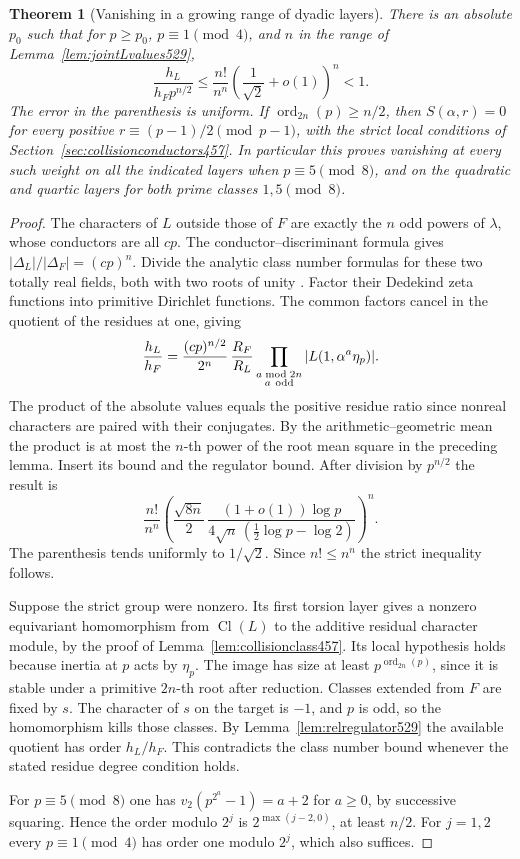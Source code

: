 \documentclass[a4paper,11pt]{article}
\newtheorem{theorem}[proposition]{Theorem}
\theoremstyle{definition}
\theoremstyle{remark}
\numberwithin{equation}{section}
\begin{document}
\begin{theorem}[Vanishing in a growing range of dyadic layers]
\leavevmode\label{thm:halfdyadic529}
There is an absolute \(p_0\) such that for \(p\ge p_0\),
\(p\equiv1\pmod4\), and \(n\) in the range of
Lemma~\ref{lem:jointLvalues529},
\[
 \frac{h_L}{h_F p^{n/2}}
        \le \frac{n!}{n^n}\left(\frac1{\sqrt2}+o(1)\right)^n
        <1 .
\]
The error in the parenthesis is uniform. If
\(\operatorname{ord}_{2n}(p)\ge n/2\), then
\(S(\alpha,r)=0\) for every positive
\(r\equiv(p-1)/2\pmod{p-1}\), with the strict local conditions
of Section~\ref{sec:collisionconductors457}. In particular this
proves vanishing at every such weight on all the indicated layers
when \(p\equiv5\pmod8\), and on the quadratic and quartic layers
for both prime classes \(1,5\pmod8\).
\end{theorem}
\begin{proof}
The characters of \(L\) outside those of \(F\) are exactly the \(n\)
odd powers of \(\lambda\), whose conductors are all \(cp\).
The conductor--discriminant formula gives
\(|\Delta_L|/|\Delta_F|=(cp)^n\).
Divide the analytic class number formulas for these two totally real
fields, both with two roots of unity \cite[Theorem~19.12]{XI-VIII-sutherland529}. Factor their Dedekind zeta
functions into primitive Dirichlet functions. The common factors
cancel in the quotient of the residues at one, giving
\[
 \frac{h_L}{h_F}=\frac{(cp)^{n/2}}{2^n}\,
            \frac{R_F}{R_L}
        \prod_{\substack{a\bmod 2n\\a\ {\rm odd}}}
                 |L(1,\alpha^a\eta_p)|.
\]
The product of the absolute values equals the positive residue
ratio since nonreal characters are paired with their conjugates.
By the arithmetic--geometric mean the product is at most the
\(n\)-th power of the root mean square in the preceding lemma.
Insert its bound and the regulator bound. After division by
\(p^{n/2}\) the result is
\[
 \frac{n!}{n^n}
 \left(
    \frac{\sqrt{8n}}{2}\,
    \frac{(1+o(1))\log p}{4\sqrt n\,(\frac12\log p-\log2)}
 \right)^n.
\]
The parenthesis tends uniformly to \(1/\sqrt2\). Since
\(n!\le n^n\) the strict inequality follows.

Suppose the strict group were nonzero. Its first torsion layer
gives a nonzero equivariant homomorphism from \(\operatorname{Cl}(L)\)
to the additive residual character module, by the proof of
Lemma~\ref{lem:collisionclass457}. Its local hypothesis holds because
inertia at \(p\) acts by \(\eta_p\). The image has size at least
\(p^{\operatorname{ord}_{2n}(p)}\), since it is stable under a
primitive \(2n\)-th root after reduction. Classes extended from
\(F\) are fixed by \(s\). The character of \(s\) on the target is
\(-1\), and \(p\) is odd, so the homomorphism kills those classes.
By Lemma~\ref{lem:relregulator529} the available quotient has
order \(h_L/h_F\). This contradicts the class number bound whenever
the stated residue degree condition holds.

For \(p\equiv5\pmod8\) one has
\(v_2(p^{2^a}-1)=a+2\) for \(a\ge0\), by successive squaring.
Hence the order modulo \(2^j\) is \(2^{\max(j-2,0)}\), at least
\(n/2\). For \(j=1,2\) every \(p\equiv1\pmod4\) has order one
modulo \(2^j\), which also suffices.
\end{proof}
\end{document}
